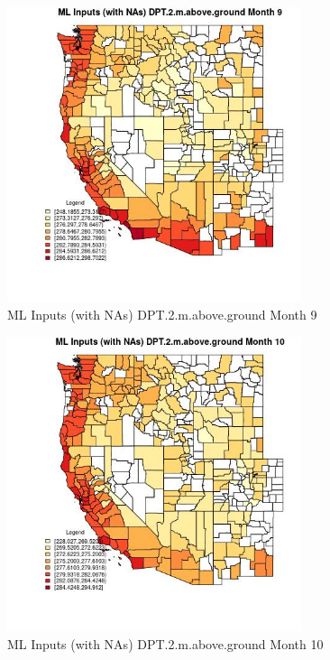 \clearpage 

\begin{figure} 
\centering  
\includegraphics[width=0.77\textwidth]{Code_Outputs/Report_ML_input_PM25_Step4_part_e_de_duplicated_aves_compiled_2019-05-21wNAs_CountyDPT2mabovegroundmedianMonth9.jpg} 
\caption{\label{fig:Report_ML_input_PM25_Step4_part_e_de_duplicated_aves_compiled_2019-05-21wNAsCountyDPT2mabovegroundmedianMonth9}ML Inputs (with NAs) DPT.2.m.above.ground Month 9} 
\end{figure} 
 

\begin{figure} 
\centering  
\includegraphics[width=0.77\textwidth]{Code_Outputs/Report_ML_input_PM25_Step4_part_e_de_duplicated_aves_compiled_2019-05-21wNAs_CountyDPT2mabovegroundmedianMonth10.jpg} 
\caption{\label{fig:Report_ML_input_PM25_Step4_part_e_de_duplicated_aves_compiled_2019-05-21wNAsCountyDPT2mabovegroundmedianMonth10}ML Inputs (with NAs) DPT.2.m.above.ground Month 10} 
\end{figure} 
 

